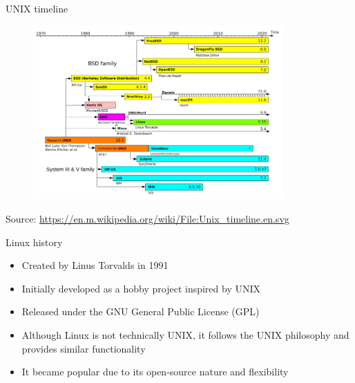 \documentclass{beamer}
\begin{document}
\begin{frame}{UNIX timeline}
  \begin{figure}[h]
    \includegraphics[width=0.85\textwidth]{images/unix-timeline.png}
  \end{figure}

  \footnotesize Source: \href{https://en.m.wikipedia.org/wiki/File:Unix_timeline.en.svg}{https://en.m.wikipedia.org/wiki/File:Unix\_timeline.en.svg}
\end{frame}

\begin{frame}{Linux history}
  \begin{itemize}
    \item Created by Linus Torvalds in 1991
    \item Initially developed as a hobby project inspired by UNIX
    \item Released under the GNU General Public License (GPL)
    \item Although Linux is not technically UNIX, it follows the UNIX philosophy and provides similar functionality
    \item It became popular due to its open-source nature and flexibility
  \end{itemize}
\end{frame}
\end{document}
